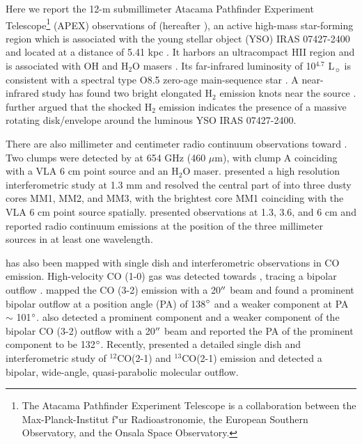 Here we report the 12-m submillimeter Atacama Pathfinder Experiment Telescope\footnote{    The Atacama Pathfinder Experiment Telescope is a collaboration between the Max-Planck-Institut f"ur Radioastronomie, the European Southern Observatory, and the Onsala Space Observatory.} (APEX) observations of  (hereafter ), an active high-mass star-forming region which is associated with the young stellar object (YSO) IRAS 07427-2400 and located at a distance of 5.41 kpc \citep{2015PASJ...67...69S}. It harbors an ultracompact HII region and is associated with OH and H$_2$O masers \citep{1993AJ....105.1495H,1997MNRAS.289..203C,1998AJ....116.1897M,1999ApJS..123..487M,2003MNRAS.341..551C}. Its far-infrared luminosity of 10$^{4.7}$ L$_\sun$ is consistent with a spectral type O8.5 zero-age main-sequence star \citep{1998AJ....116.1897M}. A near-infrared study has found two bright elongated H$_2$ emission knots near the source \citep{2002ApJ...576..313K}. \citet{2003A&A...412..175K} further argued that the shocked H$_2$ emission indicates the presence of a massive rotating disk/envelope around the luminous YSO IRAS 07427-2400. 

There are also millimeter and centimeter radio continuum observations toward . Two clumps were detected by \citet{2007ApJ...654L..87C} at 654 GHz (460 $\mu$m), with clump A coinciding with a VLA 6 cm point source \citep{1993AJ....105.1495H} and an H$_2$O maser. \citet{2009ApJ...696...66Q} presented a high resolution interferometric study at 1.3 mm and resolved the central part of  into three dusty cores MM1, MM2, and MM3, with the brightest core MM1 coinciding with the VLA 6 cm point source spatially. \citet{2011AJ....142..147T} presented observations at 1.3, 3.6, and 6 cm and reported radio continuum emissions at the position of the three millimeter sources in at least one wavelength.

 has also been mapped with single dish and interferometric observations in CO emission. High-velocity CO (1-0) gas was detected towards  \citep{1991AJ....101.1435M,1996ApJ...457..267S}, tracing a bipolar outflow \citep{1996ApJ...457..267S}. \citet{1997PhDT........21H} mapped the CO (3-2) emission with a 20${\mbox{$^{\prime\prime}$}}$ beam and found a prominent bipolar outflow at a position angle (PA) of 138${\mbox{$^\circ$}}$ and a weaker component at PA $\sim$ 101${\mbox{$^\circ$}}$. \citet{2003A&A...412..175K} also detected a prominent component and a weaker component of the bipolar CO (3-2) outflow with a 20${\mbox{$^{\prime\prime}$}}$ beam and reported the PA of the prominent component to be 132${\mbox{$^\circ$}}$. Recently, \citet{2009ApJ...696...66Q} presented a detailed single dish and interferometric study of $^{12}$CO(2-1) and $^{13}$CO(2-1) emission and detected a bipolar, wide-angle, quasi-parabolic molecular outflow. 

